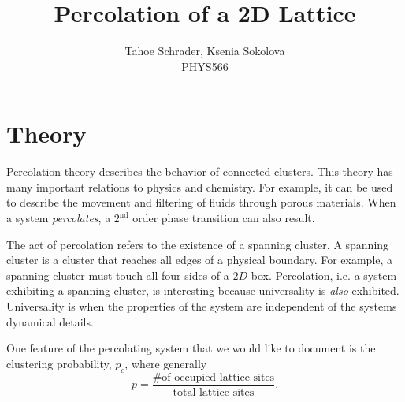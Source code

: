 \documentclass[12pt]{article}
\title{Percolation of a 2D Lattice}
\author{Tahoe Schrader, Ksenia Sokolova \\PHYS566}
\date{}
\begin{document}
\maketitle



\section{Theory}
\label{sec:theory}
Percolation theory describes the behavior of connected clusters. This theory has many important relations to physics and chemistry. For example, it can be used to describe the movement and filtering of fluids through porous materials. When a system \emph{percolates}, a $2^\text{nd}$ order phase transition can also result.

The act of percolation refers to the existence of a spanning cluster. A spanning cluster is a cluster that reaches all edges of a physical boundary. For example, a spanning cluster must touch all four sides of a $2D$ box. Percolation, i.e. a system exhibiting a spanning cluster, is interesting because universality is \emph{also} exhibited. Universality is when the properties of the system are independent of the systems dynamical details.

One feature of the percolating system that we would like to document is the clustering probability, $p_c$, where generally
\begin{equation}
  \label{eq:probability}
  p = \frac{\text{\# of occupied lattice sites}}{\text{total lattice sites}}.
\end{equation}
\end{document}
